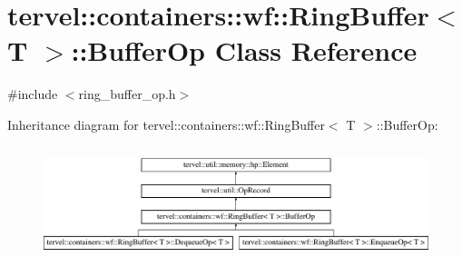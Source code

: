 \hypertarget{classtervel_1_1containers_1_1wf_1_1_ring_buffer_1_1_buffer_op}{}\section{tervel\+:\+:containers\+:\+:wf\+:\+:Ring\+Buffer$<$ T $>$\+:\+:Buffer\+Op Class Reference}
\label{classtervel_1_1containers_1_1wf_1_1_ring_buffer_1_1_buffer_op}


{\ttfamily \#include $<$ring\+\_\+buffer\+\_\+op.\+h$>$}

Inheritance diagram for tervel\+:\+:containers\+:\+:wf\+:\+:Ring\+Buffer$<$ T $>$\+:\+:Buffer\+Op\+:\begin{figure}[H]
\begin{center}
\leavevmode
\includegraphics[height=3.323442cm]{classtervel_1_1containers_1_1wf_1_1_ring_buffer_1_1_buffer_op}
\end{center}
\end{figure}
